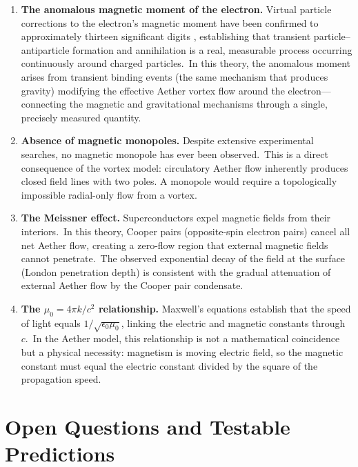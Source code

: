 ﻿\documentclass[12pt,letterpaper]{article}
\begin{document}
\begin{enumerate}[leftmargin=2em]
  \item \textbf{The anomalous magnetic moment of the electron.} Virtual particle corrections to the
    electron's magnetic moment have been confirmed to approximately thirteen significant digits \cite{fan2023},
    establishing that transient particle--antiparticle formation and annihilation is a real,
    measurable process occurring continuously around charged particles.\ In this theory,
    the anomalous moment arises from transient binding events (the same mechanism that
    produces gravity) modifying the effective Aether vortex flow around the electron---connecting the magnetic and gravitational mechanisms through a single, precisely
    measured quantity.

  \item \textbf{Absence of magnetic monopoles.} Despite extensive experimental searches, no magnetic
    monopole has ever been observed.\ This is a direct consequence of the vortex model:
    circulatory Aether flow inherently produces closed field lines with two poles.
    A monopole would require a topologically impossible radial-only flow from a vortex.

  \item \textbf{The Meissner effect.} Superconductors expel magnetic fields from their interiors.\ In
    this theory, Cooper pairs (opposite-spin electron pairs) cancel all net Aether flow,
    creating a zero-flow region that external magnetic fields cannot penetrate.\ The
    observed exponential decay of the field at the surface (London penetration depth) is
    consistent with the gradual attenuation of external Aether flow by the Cooper pair
    condensate.

  \item \textbf{The $\mu_0 = 4\pi k/c^2$ relationship.} Maxwell's equations \cite{maxwell1865} establish that the speed of
    light equals $1/\sqrt{\epsilon_0 \mu_0}$, linking the electric and magnetic constants
    through $c$.\ In the Aether model, this relationship is not a mathematical coincidence
    but a physical necessity: magnetism is moving electric field, so the magnetic constant
    must equal the electric constant divided by the square of the propagation speed.

\end{enumerate}



\section{Open Questions and Testable Predictions}
\label{sec:em-open-questions}
\end{document}

